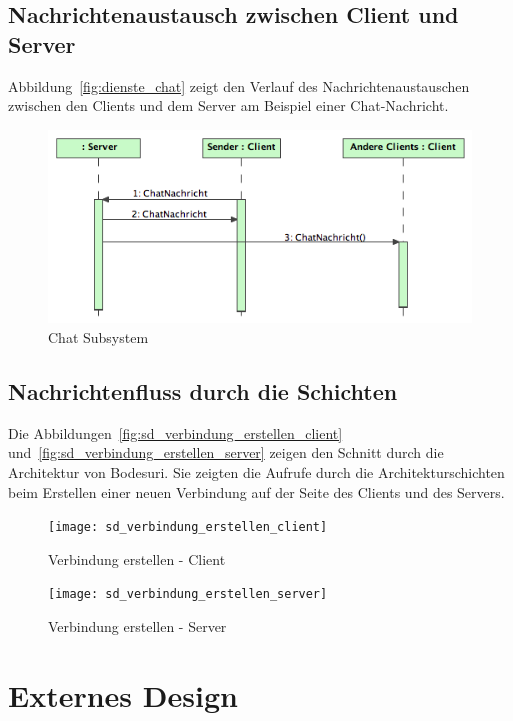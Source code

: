 \documentclass[12pt,halfparskip]{scrartcl}
\begin{document}
\subsection{Nachrichtenaustausch zwischen Client und Server} %
\label{sub:nachrichtenaustausch_zwischen_client_und_server}
Abbildung~\vref{fig:dienste_chat} zeigt den Verlauf des Nachrichtenaustauschen zwischen den Clients und dem Server am Beispiel einer Chat-Nachricht.
\begin{figure}[h]
	\centering
	\includegraphics[width=\textwidth]{dienste_chat}
	\caption{Chat Subsystem}
	\label{fig:dienste_chat}
\end{figure}

\subsection{Nachrichtenfluss durch die Schichten} %
\label{sub:nachrichtenfluss_durch_die_schichten}
Die Abbildungen~\vref{fig:sd_verbindung_erstellen_client} und~\vref{fig:sd_verbindung_erstellen_server} zeigen den Schnitt durch die Architektur von Bodesuri. Sie zeigten die Aufrufe durch die Architekturschichten beim Erstellen einer neuen Verbindung auf der Seite des Clients und des Servers.
\begin{figure}[h]
	\centering
	\texttt{[image: sd\_verbindung\_erstellen\_client]}
	\caption{Verbindung erstellen - Client}
	\label{fig:sd_verbindung_erstellen_client}
\end{figure}
\begin{figure}[h]
	\centering
	\texttt{[image: sd\_verbindung\_erstellen\_server]}
	\caption{Verbindung erstellen - Server}
	\label{fig:sd_verbindung_erstellen_server}
\end{figure}
\clearpage

\section{Externes Design} %
\label{externes_design}
\end{document}
